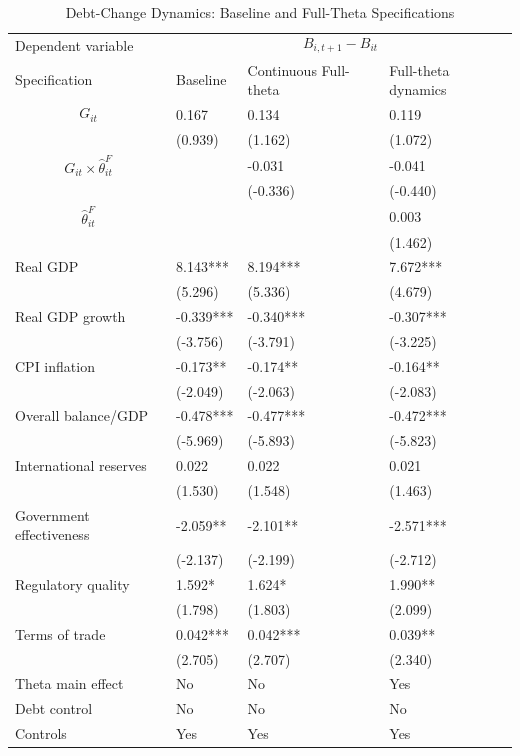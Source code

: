 \begin{table}[H]\centering
\begin{threeparttable}
\caption{Debt-Change Dynamics: Baseline and Full-Theta Specifications}
\label{tab:debt_change_combined_fulltheta}
\scriptsize
\begin{tabularx}{\textwidth}{lYYY}
\toprule
Dependent variable &  \\
\cmidrule(lr){2-4}
Specification & Baseline & Continuous Full-theta & Full-theta dynamics \\
\midrule
$$G_{it}$$ & 0.167 & 0.134 & 0.119 \\
 & (0.939) & (1.162) & (1.072) \\
$$G_{it}\times\widehat{\theta}^{F}_{it}$$ &  & -0.031 & -0.041 \\
 &  & (-0.336) & (-0.440) \\
$$\widehat{\theta}^{F}_{it}$$ &  &  & 0.003 \\
 &  &  & (1.462) \\
Real GDP & 8.143*** & 8.194*** & 7.672*** \\
 & (5.296) & (5.336) & (4.679) \\
Real GDP growth & -0.339*** & -0.340*** & -0.307*** \\
 & (-3.756) & (-3.791) & (-3.225) \\
CPI inflation & -0.173** & -0.174** & -0.164** \\
 & (-2.049) & (-2.063) & (-2.083) \\
Overall balance/GDP & -0.478*** & -0.477*** & -0.472*** \\
 & (-5.969) & (-5.893) & (-5.823) \\
International reserves & 0.022 & 0.022 & 0.021 \\
 & (1.530) & (1.548) & (1.463) \\
Government effectiveness & -2.059** & -2.101** & -2.571*** \\
 & (-2.137) & (-2.199) & (-2.712) \\
Regulatory quality & 1.592* & 1.624* & 1.990** \\
 & (1.798) & (1.803) & (2.099) \\
Terms of trade & 0.042*** & 0.042*** & 0.039** \\
 & (2.705) & (2.707) & (2.340) \\
\midrule
Theta main effect & No & No & Yes \\
Debt control & No & No & No \\
Controls & Yes & Yes & Yes \\

\end{tabularx}
\end{threeparttable}
\end{table}
